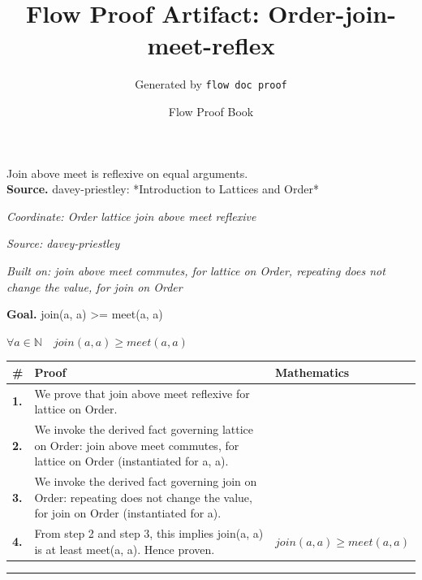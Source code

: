 \documentclass[11pt]{article}
\title{Flow Proof Artifact: Order-join-meet-reflex}
\author{Generated by \texttt{flow doc proof}}
\date{Flow Proof Book}
\theoremstyle{definition}
\begin{document}
\maketitle
Join above meet is reflexive on equal arguments.\\[0.5em]
\textbf{Source.} davey-priestley: *Introduction to Lattices and Order*\\[0.5em]
\bigskip
{}\par
\smallskip\noindent\textit{Coordinate: Order \cdot lattice \cdot join above meet reflexive}\par
\smallskip\noindent\textit{Source: davey-priestley}\par
\smallskip\noindent\textit{Built on: join above meet commutes, for lattice on Order, repeating does not change the value, for join on Order}\par
\medskip
\noindent\textbf{Goal.} join(a, a) >= meet(a, a)\par
\noindent$\displaystyle \forall a \in \mathbb{N}\quad join(a, a) \ge meet(a, a)$\par
\medskip
\noindent
\begin{tabular}{@{} >{\raggedright\arraybackslash}p{} >{\raggedright\arraybackslash}p{} >{\raggedleft\arraybackslash}p{} @{}}
\textbf{\#} & \textbf{Proof} & \textbf{Mathematics} \\
\midrule
\textbf{1.} & We prove that join above meet reflexive for lattice on Order. & \\[0.45em]
\textbf{2.} & We invoke the derived fact governing lattice on Order: join above meet commutes, for lattice on Order (instantiated for a, a). & \\[0.45em]
\textbf{3.} & We invoke the derived fact governing join on Order: repeating does not change the value, for join on Order (instantiated for a). & \\[0.45em]
\textbf{4.} & From step 2 and step 3, this implies join(a, a) is at least meet(a, a). Hence proven. & $\displaystyle join(a, a) \ge meet(a, a)$ \\[0.45em]
\bottomrule
\end{tabular}
\label{thm:Order-lattice-join_above_meet_reflexive}
\par\medskip\hrule
\end{document}
